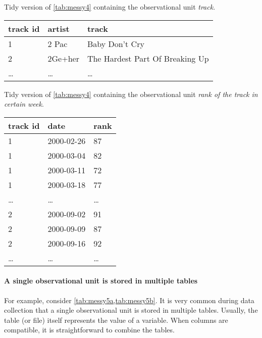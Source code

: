 \begin{tablebox}[label=tab:tidy4a]{Tidy version of \cref{tab:messy4} containing the observational unit \emph{track}.}
  \centering
  \begin{tabular}{lll}
    \toprule
    track id & artist & track \\
    \midrule
    1 & 2 Pac & Baby Don't Cry \\
    2 & 2Ge+her & The Hardest Part Of Breaking Up \\
    \dots & \dots & \dots \\
    \bottomrule
  \end{tabular}
\end{tablebox}

\begin{tablebox}[label=tab:tidy4b]{Tidy version of \cref{tab:messy4} containing the observational unit \emph{rank of the track in certain week}.}
  \centering
  \begin{tabular}{lll}
    \toprule
    track id & date & rank \\
    \midrule
    1 & 2000-02-26 & 87 \\
    1 & 2000-03-04 & 82 \\
    1 & 2000-03-11 & 72 \\
    1 & 2000-03-18 & 77 \\
    \dots & \dots & \dots \\
    2 & 2000-09-02 & 91 \\
    2 & 2000-09-09 & 87 \\
    2 & 2000-09-16 & 92 \\
    \dots & \dots & \dots \\
    \bottomrule
  \end{tabular}
\end{tablebox}

\paragraph{A single observational unit is stored in multiple tables}  For example, consider
\cref{tab:messy5a,tab:messy5b}.  It is very common during data
collection that a single observational unit is stored in multiple tables.  Usually, the
table (or file) itself represents the value of a variable.  When columns are compatible,
it is straightforward to combine the tables.

